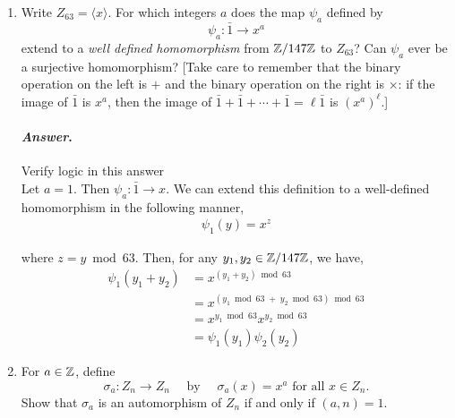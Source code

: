 \documentclass[11pt, reqno]{amsart}
\theoremstyle{plain}
\theoremstyle{definition}
\theoremstyle{example}
\newenvironment{ans}{\color{black}\medskip \paragraph*{\emph{Answer}.}}{\hfill \break  $~\!\!$ \dotfill \medskip }
\newcommand{\NOTE}[1]{{\color{red}#1}}
\def\<{\langle} \def\>{\rangle}
\begin{document}
\begin{enumerate}[1.]
\begin{enumerate}
\begin{proof}
However, note that $\{1, x, x^2, \cdots, x^{n-1}, y\} = n + 1 > |G|$. But since this is a subset of $G$, we have that,
\begin{align*}
|\{1, x, x^2, \cdots, x^{n-1}, y\}| \leq G
\end{align*}

So we have a contradiction and thus, this $y \neq x^k$ cannot exist. Hence, $G = \<x\>$.\\

Now consider the infinite group $(\mathbb{R}, +)$. We have that $|\mathbb{R}| = \infty = |2|$. However, $\mathbb{R} \neq \<1\>$ because $1 \in \mathbb{Z}$ and $\mathbb{Z}$ is closed under addition, so $\mathbb{R} \setminus \mathbb{Z}$ is not generated by $\<1\>$.
\end{proof}

\item Write $Z_{63} = \<x\>$. For which integers $a$ does the map $\psi_a$ defined by 
$$\psi_a : \bar{1} \to x^a$$
extend to a \emph{well defined homomorphism} from $\mathbb{Z}/147 \mathbb{Z}$ to $Z_{63}$? Can $\psi_a$ ever be a surjective homomorphism? 
{\small[Take care to remember that the binary operation on the left is $+$ and the binary operation on the right is $\times$: if the image of  $\bar{1}$ is $x^a$, then the image of $\bar{1} + \bar{1} + \cdots + \bar{1} = \ell\bar{1}$ is $(x^{a})^{\ell}$.]}
\begin{ans} \NOTE{Verify logic in this answer}\\
Let $a = 1$. Then $\psi_a: \bar{1} \to x$. We can extend this definition to a well-defined homomorphism in the following manner,
\begin{align*}
\psi_1(y) = x^z
\end{align*}

where $z = y \bmod 63$. Then, for any $y_1, y_2 \in \mathbb{Z}/147 \mathbb{Z}$, we have,
\begin{align*}
\psi_1(y_1 + y_2) &= x^{(y_1 + y_2) \bmod 63}\\
&= x^{(y_1 \bmod 63 \; + \; y_2 \bmod 63) \bmod 63}\\
&= x^{y_1 \bmod 63}x^{y_2 \bmod 63}\\
&= \psi_1(y_1)\psi_2(y_2)
\end{align*}
\end{ans}
\newpage
\item For $a \in \mathbb{Z}$, define 
$$\sigma_a: Z_n \to Z_n \quad \text{ by } \quad \sigma_a(x) = x^a \text{ for all } x \in Z_n.$$
Show that $\sigma_a$ is an automorphism of $Z_n$ if and only if $(a, n) = 1$. 


\end{enumerate}
\end{enumerate}
\end{document}
